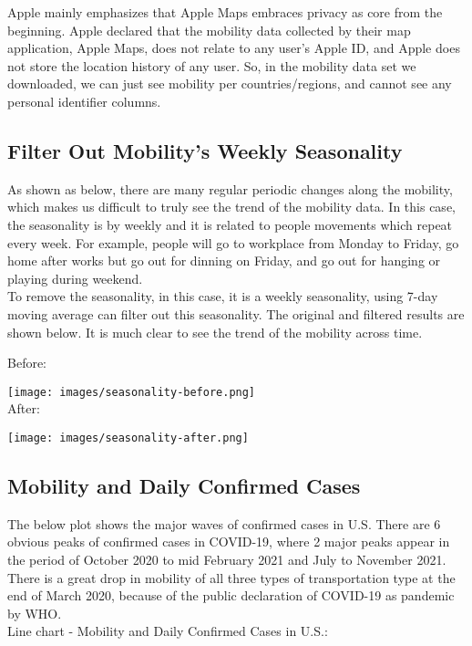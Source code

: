 Apple mainly emphasizes that Apple Maps embraces privacy as core from the beginning. Apple declared that the mobility data collected by their map application, Apple Maps, does not relate to any user's Apple ID, and Apple does not store the location history of any user. So, in the mobility data set we downloaded, we can just see mobility per countries/regions, and cannot see any personal identifier columns. \\

\subsection{Filter Out Mobility's Weekly Seasonality}
As shown as below, there are many regular periodic changes along the mobility, which makes us difficult to truly see the trend of the mobility data. In this case, the seasonality is by weekly and it is related to people movements which repeat every week. For example, people will go to workplace from Monday to Friday, go home after works but go out for dinning on Friday, and go out for hanging or playing during weekend.\\

To remove the seasonality, in this case, it is a weekly seasonality, using 7-day moving average can filter out this seasonality. The original and filtered results are shown below. It is much clear to see the trend of the mobility across time.

Before:

\texttt{[image: images/seasonality-before.png]}\\
After:

\texttt{[image: images/seasonality-after.png]}\\


\subsection{Mobility and Daily Confirmed Cases}
The below plot shows the major waves of confirmed cases in U.S. There are 6 obvious peaks of confirmed cases in COVID-19, where 2 major peaks appear in the period of October 2020 to mid February 2021 and July to November 2021. There is a great drop in mobility of all three types of transportation type at the end of March 2020, because of the public declaration of COVID-19 as pandemic by WHO. \\

Line chart - Mobility and Daily Confirmed Cases in U.S.:

